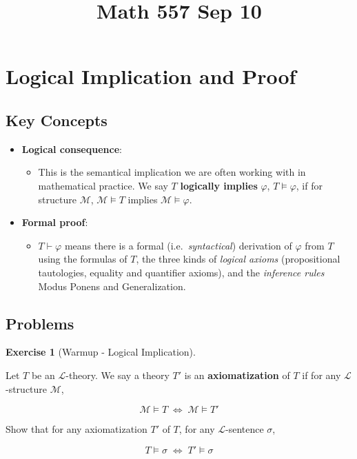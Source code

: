 \documentclass[
]{article}
\title{Math 557 Sep 10}
\author{}
\date{}
\providecommand{\tightlist}{%
  \setlength{\itemsep}{0pt}\setlength{\parskip}{0pt}}
\theoremstyle{definition}
\newtheorem{exercise}{Exercise}[section]
\theoremstyle{remark}
\begin{document}
\maketitle


\section{Logical Implication and
Proof}\label{logical-implication-and-proof}

\subsection{Key Concepts}\label{key-concepts}

\begin{itemize}
\item
  \textbf{Logical consequence}:

  \begin{itemize}
  \tightlist
  \item
    This is the semantical implication we are often working with in
    mathematical practice. We say \(T\) \textbf{logically implies}
    \(\varphi\), \(T \models \varphi\), if for structure
    \(\mathcal{M}\), \(\mathcal{M} \models T\) implies
    \(\mathcal{M} \models \varphi\).
  \end{itemize}
\item
  \textbf{Formal proof}:

  \begin{itemize}
  \tightlist
  \item
    \(T \vdash \varphi\) means there is a formal
    (i.e.~\emph{syntactical}) derivation of \(\varphi\) from \(T\) using
    the formulas of \(T\), the three kinds of \emph{logical axioms}
    (propositional tautologies, equality and quantifier axioms), and the
    \emph{inference rules} Modus Ponens and Generalization.
  \end{itemize}
\end{itemize}

\subsection{Problems}\label{problems}

\begin{exercise}[Warmup - Logical
Implication]\protect\hypertarget{exr-}{}\label{exr-}

\hfill\break
Let \(T\) be an \(\mathcal{L}\)-theory. We say a theory \(T'\) is an
\textbf{axiomatization} of \(T\) if for any \(\mathcal{L}\)-structure
\(\mathcal{M}\),

\[\mathcal{M} \models T \; \iff \; \mathcal{M} \models T'\]

Show that for any axiomatization \(T'\) of \(T\), for any
\(\mathcal{L}\)-sentence \(\sigma\),

\[T \models \sigma \; \iff \; T' \models \sigma\]

\end{exercise}
\end{document}
